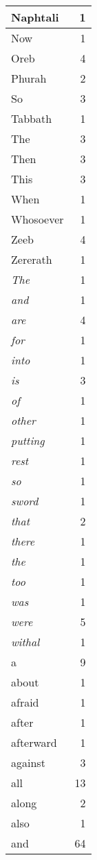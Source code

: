 \begin{center}
\begin{longtable}{l|r}
Naphtali & 1\\ \hline 
Now & 1\\ \hline 
Oreb & 4\\ \hline 
Phurah & 2\\ \hline 
So & 3\\ \hline 
Tabbath & 1\\ \hline 
The & 3\\ \hline 
Then & 3\\ \hline 
This & 3\\ \hline 
When & 1\\ \hline 
Whosoever & 1\\ \hline 
Zeeb & 4\\ \hline 
Zererath & 1\\ \hline 
\emph{The} & 1\\ \hline 
\emph{and} & 1\\ \hline 
\emph{are} & 4\\ \hline 
\emph{for} & 1\\ \hline 
\emph{into} & 1\\ \hline 
\emph{is} & 3\\ \hline 
\emph{of} & 1\\ \hline 
\emph{other} & 1\\ \hline 
\emph{putting} & 1\\ \hline 
\emph{rest} & 1\\ \hline 
\emph{so} & 1\\ \hline 
\emph{sword} & 1\\ \hline 
\emph{that} & 2\\ \hline 
\emph{there} & 1\\ \hline 
\emph{the} & 1\\ \hline 
\emph{too} & 1\\ \hline 
\emph{was} & 1\\ \hline 
\emph{were} & 5\\ \hline 
\emph{withal} & 1\\ \hline 
a & 9\\ \hline 
about & 1\\ \hline 
afraid & 1\\ \hline 
after & 1\\ \hline 
afterward & 1\\ \hline 
against & 3\\ \hline 
all & 13\\ \hline 
along & 2\\ \hline 
also & 1\\ \hline 
and & 64\\ \hline 

\end{longtable}
\end{center}
